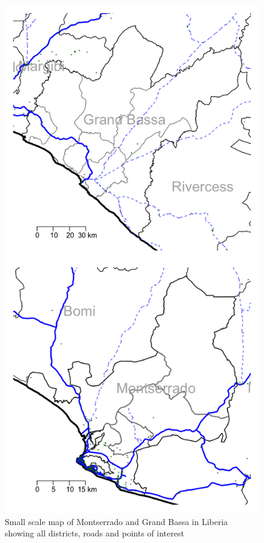 \documentclass[12pt,a4paper]{book}
\theoremstyle{definition}
\theoremstyle{definition}
\theoremstyle{definition}
\theoremstyle{remark}
\begin{document}
\begin{figure}[H]

{\centering \includegraphics{figures/smallScaleMapCounty-1} 

}

\caption{Small scale map of Montserrado and Grand Bassa in Liberia showing all districts, roads and points of interest}\label{fig:smallScaleMapCounty}
\end{figure}
\end{document}
